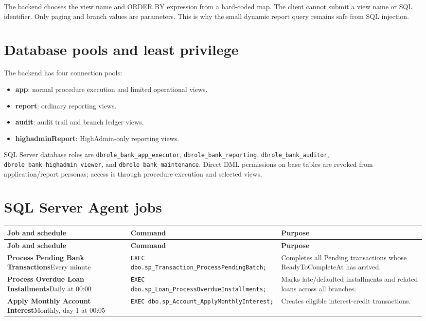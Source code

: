 \documentclass[11pt,a4paper,oneside]{report}
\begin{document}
The backend chooses the view name and ORDER BY expression from a hard-coded map. The client cannot submit a view name or SQL identifier. Only paging and branch values are parameters. This is why the small dynamic report query remains safe from SQL injection.

\section{Database pools and least privilege}
The backend has four connection pools:
\begin{itemize}
\item \textbf{app}: normal procedure execution and limited operational views.
\item \textbf{report}: ordinary reporting views.
\item \textbf{audit}: audit trail and branch ledger views.
\item \textbf{highadminReport}: HighAdmin-only reporting views.
\end{itemize}
SQL Server database roles are \texttt{dbrole\_bank\_app\_executor}, \texttt{dbrole\_bank\_reporting}, \texttt{dbrole\_bank\_auditor}, \texttt{dbrole\_bank\_highadmin\_viewer}, and \texttt{dbrole\_bank\_maintenance}. Direct DML permissions on base tables are revoked from application/report personas; access is through procedure execution and selected views.

\section{SQL Server Agent jobs}
{\footnotesize
\setlength{\tabcolsep}{4pt}
\renewcommand{\arraystretch}{1.12}
\begin{longtable}{L{0.27\textwidth}L{0.31\textwidth}L{0.33\textwidth}}
\toprule\textbf{Job and schedule} & \textbf{Command} & \textbf{Purpose}\\\midrule\endfirsthead
\toprule\textbf{Job and schedule} & \textbf{Command} & \textbf{Purpose}\\\midrule\endhead
\textbf{Process Pending Bank Transactions}\newline Every minute & \texttt{EXEC }\nolinkurl{dbo.sp_Transaction_ProcessPendingBatch;} & Completes all Pending transactions whose ReadyToCompleteAt has arrived.\\
\textbf{Process Overdue Loan Installments}\newline Daily at 00:00 & \texttt{EXEC }\nolinkurl{dbo.sp_Loan_ProcessOverdueInstallments;} & Marks late/defaulted installments and related loans across all branches.\\
\textbf{Apply Monthly Account Interest}\newline Monthly, day 1 at 00:05 & \texttt{EXEC }\nolinkurl{dbo.sp_Account_ApplyMonthlyInterest;} & Creates eligible interest-credit transactions.\\
\bottomrule
\end{longtable}
}
\end{document}
